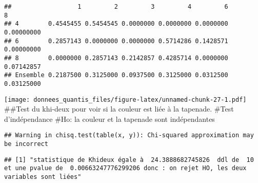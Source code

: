\documentclass[
]{article}
\newenvironment{Shaded}{\begin{snugshade}}{\end{snugshade}}
\newcommand{\AttributeTok}[1]{\textcolor[rgb]{0.77,0.63,0.00}{#1}}
\newcommand{\DecValTok}[1]{\textcolor[rgb]{0.00,0.00,0.81}{#1}}
\newcommand{\FunctionTok}[1]{\textcolor[rgb]{0.00,0.00,0.00}{#1}}
\newcommand{\NormalTok}[1]{#1}
\newcommand{\SpecialCharTok}[1]{\textcolor[rgb]{0.00,0.00,0.00}{#1}}
\newcommand{\StringTok}[1]{\textcolor[rgb]{0.31,0.60,0.02}{#1}}
\begin{document}
\begin{verbatim}
##                  1         2         3         4         6          8
## 4        0.4545455 0.5454545 0.0000000 0.0000000 0.0000000 0.00000000
## 6        0.2857143 0.0000000 0.0000000 0.5714286 0.1428571 0.00000000
## 8        0.0000000 0.2857143 0.2142857 0.4285714 0.0000000 0.07142857
## Ensemble 0.2187500 0.3125000 0.0937500 0.3125000 0.0312500 0.03125000
\end{verbatim}

\begin{Shaded}
\end{Shaded}

\texttt{[image: donnees\_quantis\_files/figure-latex/unnamed-chunk-27-1.pdf]}
\#\#Test du khi-deux pour voir si la couleur est liée à la tapenade.
\#Test d'indépendance \#Ho: la couleur et la tapenade sont indépendantes

\begin{Shaded}
\end{Shaded}

\begin{verbatim}
## Warning in chisq.test(table(x, y)): Chi-squared approximation may be incorrect
\end{verbatim}

\begin{verbatim}
## [1] "statistique de Khideux égale à  24.3888682745826  ddl de  10  et une pvalue de  0.00663247776299206 donc : on rejet HO, les deux variables sont liées"
\end{verbatim}
\end{document}
